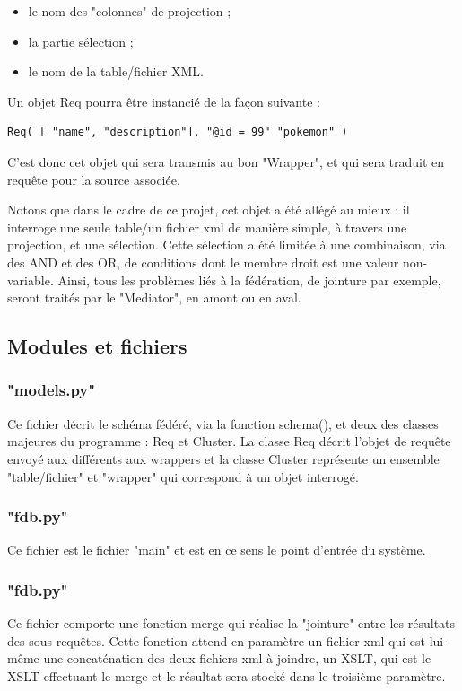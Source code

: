 \begin{itemize}
    \item le nom des "colonnes" de projection ;
    \item la partie sélection ;
    \item le nom de la table/fichier XML.
\end{itemize}

Un objet Req pourra être instancié de la façon suivante :

\begin{lstlisting}
Req( [ "name", "description"], "@id = 99" "pokemon" )
\end{lstlisting}

C’est donc cet objet qui sera transmis au bon "Wrapper", et qui sera traduit en requête pour la source associée.

Notons que dans le cadre de ce projet, cet objet a été allégé au mieux : il interroge une seule table/un fichier xml de manière simple, à travers une projection, et une sélection. Cette sélection a été limitée à une combinaison, via des AND et des OR, de conditions dont le membre droit est une valeur non-variable. Ainsi, tous les problèmes liés à la fédération, de jointure par exemple, seront traités par le "Mediator", en amont ou en aval.

\subsection{Modules et fichiers}

\subsubsection{"models.py"}

Ce fichier décrit le schéma fédéré, via la fonction schema(), et deux des classes majeures du programme : Req et Cluster. La classe Req décrit l'objet de requête envoyé aux différents aux wrappers et la classe Cluster représente un ensemble "table/fichier" et "wrapper" qui correspond à un objet interrogé.

\subsubsection{"fdb.py"}

Ce fichier est le fichier "main" et est en ce sens le point d'entrée du système.

\subsubsection{"fdb.py"}

Ce fichier comporte une fonction merge qui réalise la "jointure" entre les résultats des sous-requêtes. Cette fonction attend en paramètre un fichier xml qui est lui-même une concaténation des deux fichiers xml à joindre, un XSLT, qui est le XSLT effectuant le merge et le résultat sera stocké dans le troisième paramètre.
